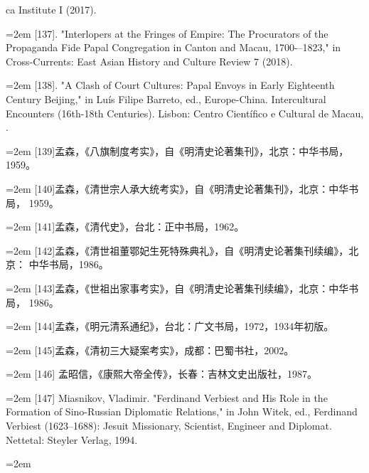 ca Institute I (2017).%
\par
\noindent\hangindent=2em
[137]. "Interlopers at the Fringes of Empire: The Procurators of the Propaganda%
\space%
Fide Papal Congregation in Canton and Macau, 1700-–1823," in Cross-Currents:%
\space%
East Asian History and Culture Review 7 (2018).%
\par
\noindent\hangindent=2em
[138]. "A Clash of Court Cultures: Papal Envoys in Early Eighteenth Century%
\space%
Beijing," in Luís Filipe Barreto, ed., Europe-China. Intercultural Encounters%
(16th-18th Centuries). Lisbon: Centro Científico e Cultural de Macau,%
.%
\par
\noindent\hangindent=2em
[139]孟森，《八旗制度考实》，自《明清史论著集刊》，北京：中华书局，%
1959。%
\par
\noindent\hangindent=2em
[140]孟森，《清世宗人承大统考实》，自《明清史论著集刊》，北京：中华书局，%
1959。%
\par
\noindent\hangindent=2em
[141]孟森，《清代史》，台北：正中书局，1962。%
\par
\noindent\hangindent=2em
[142]孟森，《清世祖董鄂妃生死特殊典礼》，自《明清史论著集刊续编》，北京：%
中华书局，1986。%
\par
\noindent\hangindent=2em
[143]孟森，《世祖出家事考实》，自《明清史论著集刊续编》，北京：中华书局，%
1986。%
\par
\noindent\hangindent=2em
[144]孟森，《明元清系通纪》，台北：广文书局，1972，1934年初版。%
\par
\noindent\hangindent=2em
[145]孟森，《清初三大疑案考实》，成都：巴蜀书社，2002。%
\par
\noindent\hangindent=2em
[146] 孟昭信，《康熙大帝全传》，长春：吉林文史出版社，1987。%
\par
\noindent\hangindent=2em
[147] Miasnikov, Vladimir. "Ferdinand Verbiest and His Role in the Formation of%
\space%
Sino-Russian Diplomatic Relations," in John Witek, ed., Ferdinand Verbiest%
(1623–1688): Jesuit Missionary, Scientist, Engineer and Diplomat. Nettetal: Steyler%
\space%
Verlag, 1994.%
\par
\noindent\hangindent=2em
